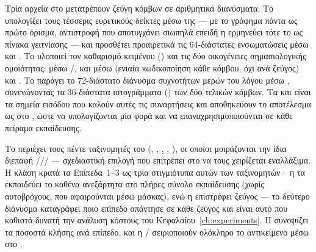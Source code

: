 Τρία αρχεία στο \texttt{} μετατρέπουν ζεύγη κόμβων σε αριθμητικά
διανύσματα. Το \texttt{} υπολογίζει τους τέσσερις ευρετικούς δείκτες μέσω
της \texttt{} — με το γράφημα πάντα ως πρώτο όρισμα, αντιστροφή
που αποτυγχάνει σιωπηλά επειδή η  ερμηνεύει τότε το  ως πίνακα
γειτνίασης — και προσθέτει προαιρετικά τις 64-διάστατες ενσωματώσεις  μέσω
\texttt{} και \texttt{}. Το \texttt{} υλοποιεί
τον καθαρισμό κειμένου  (\texttt{}) και τις δύο οικογένειες
σημασιολογικής ομοιότητας:  μέσω \texttt{}/\texttt{}, και
 μέσω \texttt{} (ενιαία κωδικοποίηση κάθε κόμβου, όχι
ανά ζεύγος) και \texttt{}. Το \texttt{} παράγει το
72-διάστατο διάνυσμα συχνοτήτων μερών του λόγου μέσω \texttt{},
συνενώνοντας τα 36-διάστατα ιστογράμματα (\texttt{}) των δύο τελικών
κόμβων. Τα \texttt{} και \texttt{} είναι τα σημεία
εισόδου  που καλούν αυτές τις συναρτήσεις και αποθηκεύουν το αποτέλεσμα ως
 στο \texttt{}, ώστε να υπολογίζονται μία φορά και να επαναχρησιμοποιούνται
σε κάθε πείραμα εκπαίδευσης.

Το \texttt{} περιέχει τους πέντε ταξινομητές του 
(\texttt{}, \texttt{}, \texttt{},
\texttt{}, \texttt{}), οι οποίοι μοιράζονται την ίδια διεπαφή
\texttt{}/\texttt{}/\texttt{}/\texttt{} — σχεδιαστική επιλογή που επιτρέπει
στο \texttt{} να τους χειρίζεται εναλλάξιμα. Η κλάση \texttt{}
κρατά τα Επίπεδα~1--3 ως τρία στιγμιότυπα αυτών των ταξινομητών· η
\texttt{} τα εκπαιδεύει το καθένα ανεξάρτητα στο πλήρες σύνολο εκπαίδευσης (χωρίς
αυτοβρόχους, που αφαιρούνται μέσω μάσκας), ενώ η \texttt{} επιστρέφει ζεύγος
\texttt{} — το δεύτερο διάνυσμα καταγράφει ποιο επίπεδο απάντησε σε
κάθε ζεύγος και είναι αυτό που καθιστά δυνατή την ανάλυση κόστους του
Κεφαλαίου~\ref{ch:experiments}. Η \texttt{} συνοψίζει τα ποσοστά κλήσης ανά
επίπεδο, και η \texttt{}/\texttt{} σειριοποιούν ολόκληρο το αντικείμενο μέσω
\texttt{} στο \texttt{}.

